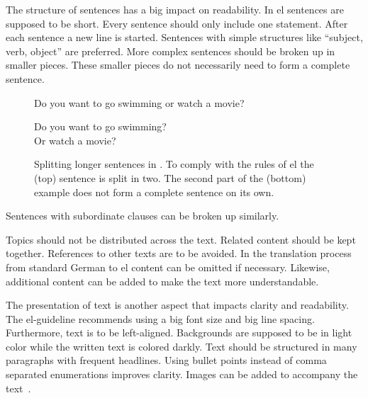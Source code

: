 The structure of sentences has a big impact on readability. %
In \gls{el} sentences are supposed to be short.
Every sentence should only include one statement.
After each sentence a new line is started.
Sentences with simple structures like \enquote{subject, verb, object} are preferred.
More complex sentences should be broken up in smaller pieces.
These smaller pieces do not necessarily need to form a complete sentence.
\begin{figure}[htb]
    \begin{center}
        \colorbox{badred!20}{
            \begin{minipage}{0.6\textwidth}
                Do you want to go swimming or watch a movie?
            \end{minipage}
        }
        \colorbox{goodgreen!20}{
            \begin{minipage}{0.6\textwidth}
                Do you want to go swimming? \\
                Or watch a movie?
            \end{minipage}
        }
    \end{center}
    \caption[Splitting longer sentences in .]{Splitting longer sentences in . To comply with the rules of \gls{el} the (top) sentence is split in two. The second part of the (bottom) example does not form a complete sentence on its own.}
    \label{fig:split_sentence}
\end{figure}
Sentences with subordinate clauses can be broken up similarly.

Topics should not be distributed across the text.
Related content should be kept together.
References to other texts are to be avoided.
In the translation process from standard German to \gls{el} content can be omitted if necessary.
Likewise, additional content can be added to make the text more understandable.

The presentation of text is another aspect that impacts clarity and readability.
The \gls{el}-guideline recommends using a big font size and big line spacing.
Furthermore, text is to be left-aligned.
Backgrounds are supposed to be in light color while the written text is colored darkly.
Text should be structured in many paragraphs with frequent headlines.
Using bullet points instead of comma separated enumerations improves clarity.
Images can be added to accompany the text~\autocite{netzwerkLS}.

